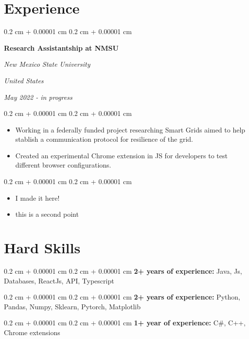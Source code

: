 \documentclass[10pt,letterpaper]{article}%
\newenvironment{highlights}{
    \begin{itemize}[
        topsep=0.10 cm,
        parsep=0.10 cm,
        partopsep=0pt,
        itemsep=0pt,
        leftmargin=0.4 cm + 10pt
    ]
}{
    \end{itemize}
} %
\newenvironment{onecolentry}{
    \begin{adjustwidth}{
        0.2 cm + 0.00001 cm
    }{
        0.2 cm + 0.00001 cm
    }
}{
    \end{adjustwidth}
} %
\newenvironment{twocolentry}[2][]{
    \onecolentry
    \def\secondColumn{#2}
    \setcolumnwidth{\fill, 4.5 cm}
    \begin{paracol}{2}
}{
    \switchcolumn \raggedleft \secondColumn
    \end{paracol}
    \endonecolentry
} %
\begin{document}
\section{Experience} %
\label{section:Experience}%
 \begin{twocolentry}{ %
        \textit{United States}
        
        \textit{May 2022 - in progress}
    }
        \textbf{Research Assistantship at NMSU}
        
        \textit{New Mexico State University}
    \end{twocolentry}
    \vspace{0.10 cm}%
\begin{onecolentry} %
            \begin{highlights}%
\item Working in a federally funded project researching Smart Grids aimed to help stablish a communication protocol for resilience of the grid.%
\item Created an experimental Chrome extension in JS for developers to test different browser configurations.%
\end{highlights}    
            \end{onecolentry}%
\begin{onecolentry} %
            \begin{highlights}%
\item I made it here!%
\item this is a second point%
\end{highlights}    
            \end{onecolentry}%
\section{Hard Skills}  %
\begin{onecolentry} %
            \textbf{2+ years of experience:} Java, Js, Databases, ReactJs, API, Typescript
        \end{onecolentry}
        \vspace{0.2 cm}%
\begin{onecolentry} %
            \textbf{2+ years of experience:} Python, Pandas, Numpy, Sklearn, Pytorch, Matplotlib
        \end{onecolentry}
        \vspace{0.2 cm}%
\begin{onecolentry} %
            \textbf{1+ year of experience:} C\#, C++, Chrome extensions
        \end{onecolentry}
        \vspace{0.2 cm}%
\end{document}
